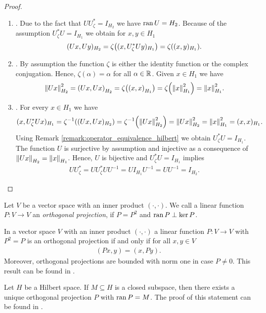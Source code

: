 \begin{proof}
	\begin{enumerate}
		\phantom{}
		\item[]. Due to the fact that $U U_\zeta^\ast = I_{H_2}$ we have $\ran U = H_2$. Because of the assumption $U_\zeta^\ast U = I_{H_1}$ we obtain for $x,y \in H_1$ 
		\begin{align*}
			(Ux, Uy)_{H_2} = \zeta\pbraces{(x, U_\zeta^\ast U y)_{H_1}} = \zeta \pbraces{(x,y)_{H_1}}.
		\end{align*}
		
		\item[]. By assumption the function $\zeta$ is either the identity function or the complex conjugation. Hence, $\zeta(\alpha) = \alpha$ for all $\alpha \in \R$. Given $x \in H_1$ we have
		\begin{align*}
			\norm[H_2]{Ux}^2 = \pbraces{Ux, Ux}_{H_2} = \zeta\pbraces{\pbraces{x, x}_{H_1}} = \zeta\pbraces{\norm[H_1]{x}^2} = \norm[H_1]{x}^2.
		\end{align*} 
		
		\item[]. For every $x \in H_1$ we have 
		\begin{align*}
			(x, U_\zeta^\ast U x)_{H_1} = \zeta^{-1}\pbraces{(Ux, Ux)_{H_2}} = \zeta^{-1} \pbraces{\norm[H_2]{Ux}^2} = \norm[H_2]{Ux}^2 = \norm[H_1]{x}^2 = (x,x)_{H_1}.
		\end{align*}
		Using Remark \ref{remark:operator_equivalence_hilbert} we obtain $U_\zeta^\ast U = I_{H_1}$. The function $U$ is surjective by assumption and injective as a consequence of $\norm[H_2]{Ux} = \norm[H_1]{x}$. Hence, $U$ is bijective and $U_\zeta^\ast U = I_{H_1}$ implies
		\begin{align*}
			U U_\zeta^\ast = U U_\zeta^\ast UU^{-1} = UI_{H_1}U^{-1} = UU^{-1} = I_{H_2}.
		\end{align*}
	\end{enumerate}
\end{proof}


\begin{definition}
	Let $V$ be a vector space with an inner product $(\cdot, \cdot)$. We call a linear function $P: V \to V$ an \textit{orthogonal projection}, if $P = P^2$ and $\ran P \perp \ker P$.
\end{definition}


\begin{remark}
	In a vector space $V$ with an inner product $(\cdot, \cdot)$ a linear function $P: V \to V$ with $P^2 = P$ is an orthogonal projection if and only if for all $x,y \in V$
	\begin{align*}
		(Px, y) = (x,Py).
	\end{align*}
	Moreover, orthogonal projections are bounded with norm one in case $P \neq 0$. This result can be found in \cite[p. 47]{FAna1}.
\end{remark}


\begin{remark} \label{remark:orth_proj_uniqueness}
	Let $H$ be a Hilbert space. If $M \subseteq H$ is a closed subspace, then there exists a unique orthogonal projection $P$ with $\ran P = M$. The proof of this statement can be found in \cite[p. 48]{FAna1}.
\end{remark}